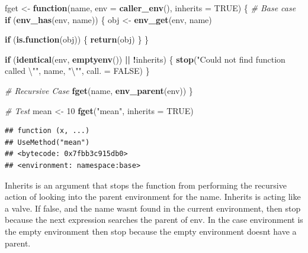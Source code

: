 \documentclass[]{book}
\newenvironment{Shaded}{\begin{snugshade}}{\end{snugshade}}
\newcommand{\CharTok}[1]{\textcolor[rgb]{0.31,0.60,0.02}{#1}}
\newcommand{\CommentTok}[1]{\textcolor[rgb]{0.56,0.35,0.01}{\textit{#1}}}
\newcommand{\ControlFlowTok}[1]{\textcolor[rgb]{0.13,0.29,0.53}{\textbf{#1}}}
\newcommand{\DataTypeTok}[1]{\textcolor[rgb]{0.13,0.29,0.53}{#1}}
\newcommand{\DecValTok}[1]{\textcolor[rgb]{0.00,0.00,0.81}{#1}}
\newcommand{\KeywordTok}[1]{\textcolor[rgb]{0.13,0.29,0.53}{\textbf{#1}}}
\newcommand{\NormalTok}[1]{#1}
\newcommand{\OperatorTok}[1]{\textcolor[rgb]{0.81,0.36,0.00}{\textbf{#1}}}
\newcommand{\OtherTok}[1]{\textcolor[rgb]{0.56,0.35,0.01}{#1}}
\newcommand{\StringTok}[1]{\textcolor[rgb]{0.31,0.60,0.02}{#1}}
\begin{document}
\begin{Shaded}
\begin{Highlighting}[]
\NormalTok{fget <-}\StringTok{ }\ControlFlowTok{function}\NormalTok{(name, }\DataTypeTok{env =} \KeywordTok{caller_env}\NormalTok{(), }\DataTypeTok{inherits =} \OtherTok{TRUE}\NormalTok{) \{}
  \CommentTok{# Base case}
  \ControlFlowTok{if}\NormalTok{ (}\KeywordTok{env_has}\NormalTok{(env, name)) \{}
\NormalTok{    obj <-}\StringTok{ }\KeywordTok{env_get}\NormalTok{(env, name)}

    \ControlFlowTok{if}\NormalTok{ (}\KeywordTok{is.function}\NormalTok{(obj)) \{}
      \KeywordTok{return}\NormalTok{(obj)}
\NormalTok{    \}}
\NormalTok{  \}}

  \ControlFlowTok{if}\NormalTok{ (}\KeywordTok{identical}\NormalTok{(env, }\KeywordTok{emptyenv}\NormalTok{()) }\OperatorTok{||}\StringTok{ }\OperatorTok{!}\NormalTok{inherits) \{}
    \KeywordTok{stop}\NormalTok{(}\StringTok{"Could not find function called }\CharTok{\textbackslash{}"}\StringTok{"}\NormalTok{, name, }\StringTok{"}\CharTok{\textbackslash{}"}\StringTok{"}\NormalTok{, }\DataTypeTok{call. =} \OtherTok{FALSE}\NormalTok{)}
\NormalTok{  \}}

  \CommentTok{# Recursive Case}
  \KeywordTok{fget}\NormalTok{(name, }\KeywordTok{env_parent}\NormalTok{(env))}
\NormalTok{\}}
\end{Highlighting}
\end{Shaded}

\begin{Shaded}
\begin{Highlighting}[]
\CommentTok{# Test}
\NormalTok{mean <-}\StringTok{ }\DecValTok{10}
\KeywordTok{fget}\NormalTok{(}\StringTok{"mean"}\NormalTok{, }\DataTypeTok{inherits =} \OtherTok{TRUE}\NormalTok{)}
\end{Highlighting}
\end{Shaded}

\begin{verbatim}
## function (x, ...) 
## UseMethod("mean")
## <bytecode: 0x7fbb3c915db0>
## <environment: namespace:base>
\end{verbatim}

Inherits is an argument that stops the function from performing the recursive action of looking into the parent environment for the name. Inherits is acting like a valve. If false, and the name wasnt found in the current environment, then stop because the next expression searches the parent of env. In the case environment is the empty environment then stop because the empty environment doesnt have a parent.
\end{document}
